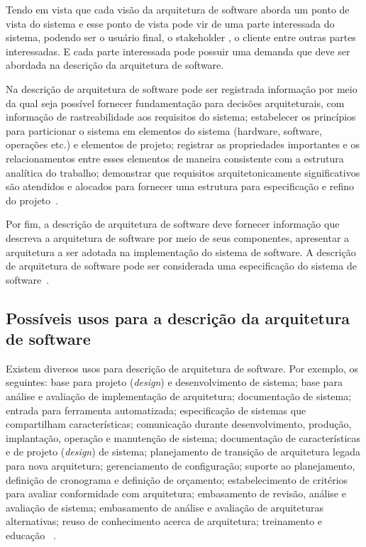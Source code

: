 Tendo em vista que cada visão da arquitetura de software aborda um ponto de vista do sistema e esse ponto de vista pode vir de uma parte interessada do sistema, podendo ser o usuário final, o stakeholder , o cliente entre outras partes interessadas. E cada parte interessada pode possuir uma demanda que deve ser abordada  na descrição da arquitetura de software. 

Na descrição de arquitetura de software pode ser registrada informação por meio da qual seja possível  fornecer fundamentação para decisões arquiteturais, com informação de rastreabilidade aos requisitos do sistema; estabelecer os princípios para particionar o sistema em elementos do sistema (hardware, software, operações etc.) e elementos de projeto; registrar as propriedades importantes e os relacionamentos entre esses elementos de maneira consistente com a estrutura analítica do trabalho; demonstrar que requisitos arquitetonicamente significativos são atendidos e alocados para fornecer uma estrutura para especificação e refino do projeto~\cite{ISO_15289}. 

Por fim, a descrição de arquitetura de software deve fornecer informação que descreva a arquitetura de software por meio de seus componentes, apresentar a arquitetura a ser adotada na implementação do sistema de software. A descrição de arquitetura de software pode ser considerada uma especificação do sistema de software~\cite{ISO_15289}.

\subsection{Possíveis usos para a descrição da arquitetura de software}

Existem diversos usos para descrição de arquitetura de software. Por exemplo, os seguintes: base para projeto (\emph{design}) e desenvolvimento de sistema; base para análise e avaliação de implementação de arquitetura; documentação de sistema; entrada para ferramenta automatizada; especificação de sistemas que compartilham características; comunicação durante desenvolvimento, produção, implantação, operação e manutenção de sistema; documentação de características e de projeto (\emph{design}) de sistema; planejamento de transição de arquitetura legada para nova arquitetura; gerenciamento de configuração; suporte ao planejamento, definição de cronograma e definição de orçamento; estabelecimento de critérios para avaliar conformidade com arquitetura; embasamento de revisão, análise e avaliação de sistema; embasamento de análise e avaliação de arquiteturas alternativas; reuso de conhecimento acerca de arquitetura; treinamento e educação ~\cite{ISO_42010}.

